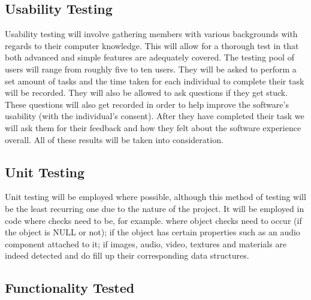 \documentclass{article}
\begin{document}
	\subsection{Usability Testing}

	Usability testing will involve gathering members with various backgrounds with regards to their computer knowledge. This will allow for a thorough test in that both
	advanced and simple features are adequately covered. The testing pool of users will range from roughly five to ten users. They will be asked to perform a set amount of
	tasks and the time taken for each individual to complete their task will be recorded. They will also be allowed to ask questions if they get stuck. These questions will
	also get recorded in order to help improve the software's usability (with the individual's consent). After they have completed their task we will ask them for their
	feedback and how they felt about the software experience overall. All of these results will be taken into consideration.

	\subsection{Unit Testing}

	Unit testing will be employed where possible, although this method of testing will be the least recurring one due to the nature of the project. It will be employed in code
	where checks need to be, for example. where object checks need to occur (if the object is NULL or not); if the object has certain properties such as an audio
	component attached to it; if images, audio, video, textures and materials are indeed detected and do fill up their corresponding data structures.

	\subsection{Functionality Tested}
\end{document}
